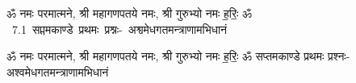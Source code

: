 \documentclass[17pt]{extarticle}
\begin{document}
\begin{titlepage}
    \begin{center}
 
\begin{sanskrit}
    { \Large
    ॐ नमः परमात्मने, श्री महागणपतये नमः, श्री गुरुभ्यो नमः
ह॒रिः॒ ॐ 
    }
    \\
    \vspace{2.5cm}
    \mbox{ \Huge
    7.1      सप्तमकाण्डे प्रथमः प्रश्नः- अश्वमेधगतमन्त्राणामभिधानं   }
\end{sanskrit}
\end{center}

\end{titlepage}
\tableofcontents

ॐ नमः परमात्मने, श्री महागणपतये नमः, श्री गुरुभ्यो नमः
ह॒रिः॒ ॐ       सप्तमकाण्डे प्रथमः प्रश्नः- अश्वमेधगतमन्त्राणामभिधानं \newline

\end{document}
